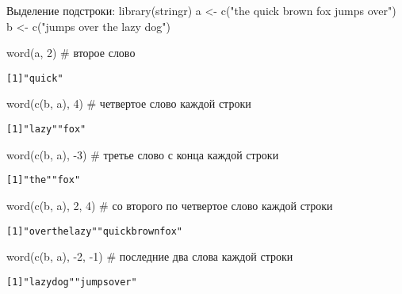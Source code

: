 \begin{frame}[fragile]{Выделение подстроки: library(stringr)}
a <- c("the quick brown fox jumps over"{})\\
b <- c("jumps over the lazy dog"{})
\begin{itemize}
\vfill
\mytem word(a, 2) \hfill \# второе слово
\footnotesize
\begin{alltt}
[1] "quick"
\end{alltt}
\normalsize
\vfill
\mytem word(c(b, a), 4) \hfill \# четвертое слово каждой строки
\footnotesize
\begin{alltt}
[1] "lazy"{ }"fox"
\end{alltt}
\normalsize
\vfill
\mytem word(c(b, a), -3) \hfill \# третье слово с конца каждой строки
\footnotesize
\begin{alltt}
[1] "the"{ }"fox"
\end{alltt}
\normalsize
\vfill
\mytem word(c(b, a), 2, 4) \hfill \# со второго по четвертое слово каждой строки
\footnotesize
\begin{alltt}
[1] "over the lazy"{ }"quick brown fox"
\end{alltt}
\normalsize
\vfill
\mytem word(c(b, a), -2, -1) \hfill \# последние два слова каждой строки
\footnotesize
\begin{alltt}
[1] "lazy dog"{ }"jumps over"
\end{alltt}
\normalsize
\end{itemize}
\end{frame}
